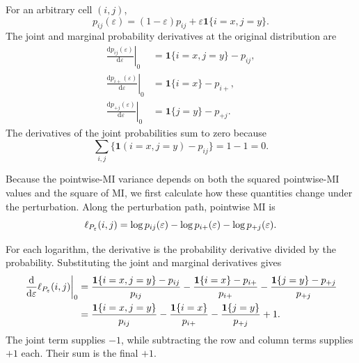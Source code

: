 For an arbitrary cell \((i,j)\),
\begin{equation}
  p_{ij}(\varepsilon)
  =(1-\varepsilon)p_{ij}
  +\varepsilon\mathbf 1\{i=x,j=y\}.
\end{equation}
The joint and marginal probability derivatives at the original distribution
are
\begin{align}
  \left.\frac{\mathrm d p_{ij}(\varepsilon)}{\mathrm d\varepsilon}
  \right|_{0}
  &=\mathbf 1\{i=x,j=y\}-p_{ij},
  \label{eq:joint-perturbation-derivative}\\
  \left.\frac{\mathrm d p_{i+}(\varepsilon)}{\mathrm d\varepsilon}
  \right|_{0}
  &=\mathbf 1\{i=x\}-p_{i+},\\
  \left.\frac{\mathrm d p_{+j}(\varepsilon)}{\mathrm d\varepsilon}
  \right|_{0}
  &=\mathbf 1\{j=y\}-p_{+j}.
\end{align}
The derivatives of the joint probabilities sum to zero because
\begin{equation}
  \sum_{i,j}
  \{\mathbf 1(i=x,j=y)-p_{ij}\}
  =1-1=0.
\end{equation}

\medskip
{}

Because the pointwise-MI variance depends on both the squared pointwise-MI
values and the square of MI, we first calculate how these quantities change
under the perturbation.
Along the perturbation path, pointwise MI is
\begin{equation}
  \ell_{P_\varepsilon}(i,j)
  =\log p_{ij}(\varepsilon)
  -\log p_{i+}(\varepsilon)
  -\log p_{+j}(\varepsilon).
\end{equation}
\begin{samepage}%
For each logarithm, the derivative is the probability derivative divided by
the probability. Substituting the joint and marginal derivatives gives
\begin{align}
  \left.
  \frac{\mathrm d}{\mathrm d\varepsilon}
  \ell_{P_\varepsilon}(i,j)
  \right|_{0}
  &={}
  \frac{\mathbf 1\{i=x,j=y\}-p_{ij}}{p_{ij}}
  -\frac{\mathbf 1\{i=x\}-p_{i+}}{p_{i+}}
  -\frac{\mathbf 1\{j=y\}-p_{+j}}{p_{+j}}
  \notag\\*
  &={}
  \frac{\mathbf 1\{i=x,j=y\}}{p_{ij}}
  -\frac{\mathbf 1\{i=x\}}{p_{i+}}
  -\frac{\mathbf 1\{j=y\}}{p_{+j}}
  +1.
  \label{eq:pmi-derivative}
\end{align}
The joint term supplies \(-1\), while subtracting the row and column
terms supplies \(+1\) each. Their sum is the final \(+1\).
\par
\end{samepage}

